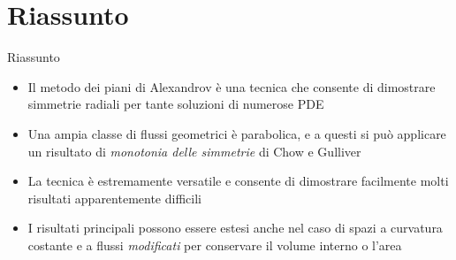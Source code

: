 \section{Riassunto}
\begin{frame}{Riassunto}{}
	\begin{itemize}
		\item Il metodo dei piani di Alexandrov è una tecnica che consente di dimostrare simmetrie radiali per tante soluzioni di numerose PDE
		\item<2-> Una ampia classe di flussi geometrici è parabolica, e a questi si può applicare un risultato di \textit{monotonia delle simmetrie} di Chow e Gulliver
		\item<3-> La tecnica è estremamente versatile e consente di dimostrare facilmente molti risultati apparentemente difficili
		\item<4-> I risultati principali possono essere estesi anche nel caso di spazi a curvatura costante e a flussi \textit{modificati} per conservare il volume interno o l'area
	\end{itemize}
\end{frame}
